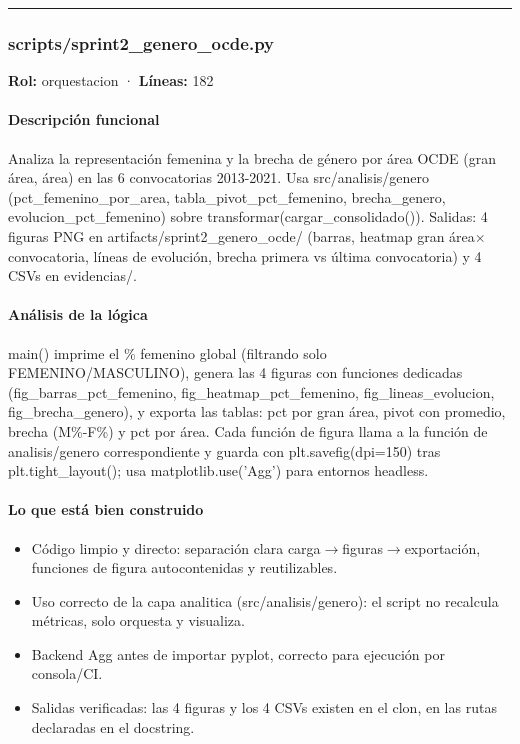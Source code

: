 \medskip
\hrule

\subsubsection{scripts/sprint2\_genero\_ocde.py}
\textbf{Rol:} orquestacion · \textbf{Líneas:} 182

\paragraph{Descripción funcional}
Analiza la representación femenina y la brecha de género por área OCDE (gran área, área) en las 6 convocatorias 2013-2021. Usa src/analisis/genero (pct\_femenino\_por\_area, tabla\_pivot\_pct\_femenino, brecha\_genero, evolucion\_pct\_femenino) sobre transformar(cargar\_consolidado()). Salidas: 4 figuras PNG en artifacts/sprint2\_genero\_ocde/ (barras, heatmap gran área$\times$convocatoria, líneas de evolución, brecha primera vs última convocatoria) y 4 CSVs en evidencias/.

\paragraph{Análisis de la lógica}
main() imprime el \% femenino global (filtrando solo FEMENINO/MASCULINO), genera las 4 figuras con funciones dedicadas (fig\_barras\_pct\_femenino, fig\_heatmap\_pct\_femenino, fig\_lineas\_evolucion, fig\_brecha\_genero), y exporta las tablas: pct por gran área, pivot con promedio, brecha (M\%-F\%) y pct por área. Cada función de figura llama a la función de analisis/genero correspondiente y guarda con plt.savefig(dpi=150) tras plt.tight\_layout(); usa matplotlib.use('Agg') para entornos headless.

\paragraph{Lo que está bien construido}
\begin{itemize}
  \item Código limpio y directo: separación clara carga$\rightarrow$figuras$\rightarrow$exportación, funciones de figura autocontenidas y reutilizables.
  \item Uso correcto de la capa analitica (src/analisis/genero): el script no recalcula métricas, solo orquesta y visualiza.
  \item Backend Agg antes de importar pyplot, correcto para ejecución por consola/CI.
  \item Salidas verificadas: las 4 figuras y los 4 CSVs existen en el clon, en las rutas declaradas en el docstring.
\end{itemize}

